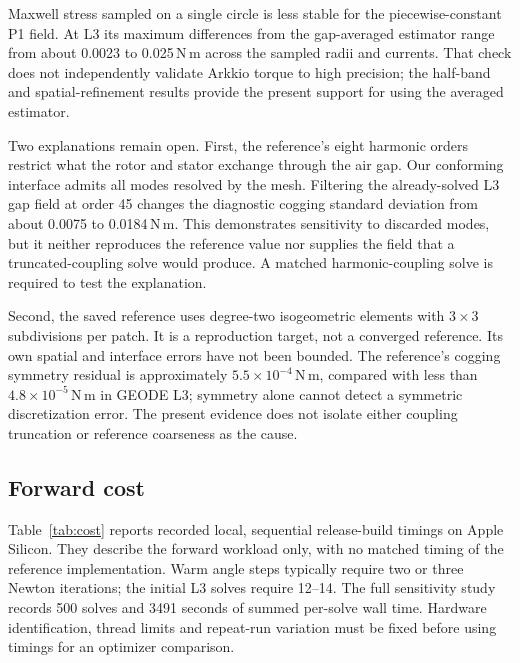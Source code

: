 \documentclass{anvil-paper}
\begin{document}
Maxwell stress sampled on a single circle is less stable for the
piecewise-constant P1 field. At L3 its maximum differences from the
gap-averaged estimator range from about 0.0023 to 0.025\,N\,m across the
sampled radii and currents. That check does not independently validate
Arkkio torque to high precision; the half-band and spatial-refinement
results provide the present support for using the averaged estimator.

Two explanations remain open. First, the reference's eight harmonic
orders restrict what the rotor and stator exchange through the air gap.
Our conforming interface admits all modes resolved by the mesh. Filtering
the already-solved L3 gap field at order 45 changes the diagnostic cogging
standard deviation from about 0.0075 to 0.0184\,N\,m. This demonstrates
sensitivity to discarded modes, but it neither reproduces the reference
value nor supplies the field that a truncated-coupling solve would produce.
A matched harmonic-coupling solve is required to test the explanation.

Second, the saved reference uses degree-two isogeometric elements with
$3\times3$ subdivisions per patch. It is a reproduction target, not a
converged reference. Its own spatial and interface errors have not been
bounded. The reference's cogging symmetry residual is approximately
$5.5\times10^{-4}$\,N\,m, compared with less than
$4.8\times10^{-5}$\,N\,m in GEODE L3; symmetry alone cannot detect a
symmetric discretization error. The present evidence does not isolate
either coupling truncation or reference coarseness as the cause.

\subsection{Forward cost}
Table~\ref{tab:cost} reports recorded local, sequential release-build
timings on Apple Silicon. They describe the forward workload only, with
no matched timing of the reference implementation. Warm angle steps
typically require two or three Newton iterations; the initial L3 solves
require 12--14. The full sensitivity study records 500 solves and 3491 seconds of summed per-solve wall time. Hardware identification, thread limits
and repeat-run variation must be fixed before using timings for an
optimizer comparison.
\begin{table}[htbp]\centering
\caption{Recorded baseline forward cost. Median wall time is taken over
all 60 solves per mesh, including the three initial solves. Totals sum
per-solve wall time and exclude mesh generation and setup.}
\label{tab:cost}

\end{table}
\end{document}
